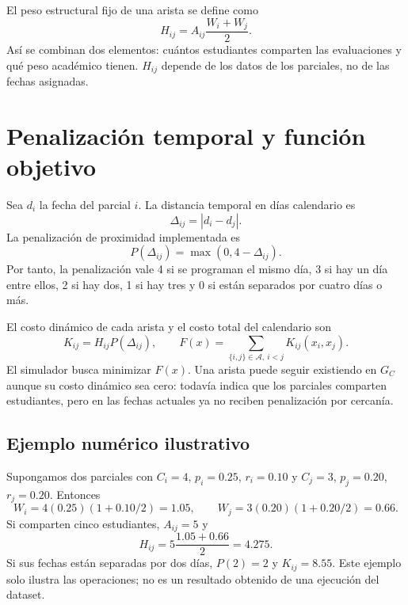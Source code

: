 \documentclass[11pt,a4paper]{article}
\begin{document}
El peso estructural fijo de una arista se define como
\[
H_{ij}=A_{ij}\frac{W_i+W_j}{2}.
\]
Así se combinan dos elementos: cuántos estudiantes comparten las evaluaciones y qué peso académico tienen. $H_{ij}$ depende de los datos de los parciales, no de las fechas asignadas.

\section{Penalización temporal y función objetivo}
Sea $d_i$ la fecha del parcial $i$. La distancia temporal en días calendario es
\[
\Delta_{ij}=|d_i-d_j|.
\]
La penalización de proximidad implementada es
\[
P(\Delta_{ij})=\max(0,4-\Delta_{ij}).
\]
Por tanto, la penalización vale 4 si se programan el mismo día, 3 si hay un día entre ellos, 2 si hay dos, 1 si hay tres y 0 si están separados por cuatro días o más.

El costo dinámico de cada arista y el costo total del calendario son
\[
K_{ij}=H_{ij}P(\Delta_{ij}),\qquad
F(x)=\sum_{\{i,j\}\in\mathcal A,\ i<j}K_{ij}(x_i,x_j).
\]
El simulador busca minimizar $F(x)$. Una arista puede seguir existiendo en $G_C$ aunque su costo dinámico sea cero: todavía indica que los parciales comparten estudiantes, pero en las fechas actuales ya no reciben penalización por cercanía.

\subsection{Ejemplo numérico ilustrativo}
Supongamos dos parciales con $C_i=4$, $p_i=0.25$, $r_i=0.10$ y $C_j=3$, $p_j=0.20$, $r_j=0.20$. Entonces
\[
W_i=4(0.25)(1+0.10/2)=1.05,\qquad
W_j=3(0.20)(1+0.20/2)=0.66.
\]
Si comparten cinco estudiantes, $A_{ij}=5$ y
\[
H_{ij}=5\frac{1.05+0.66}{2}=4.275.
\]
Si sus fechas están separadas por dos días, $P(2)=2$ y $K_{ij}=8.55$. Este ejemplo solo ilustra las operaciones; no es un resultado obtenido de una ejecución del dataset.
\end{document}
